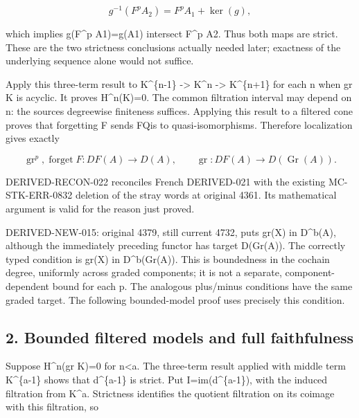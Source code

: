 \[
 g^{-1}(F^p A_2)=F^p A_1+\ker(g),
\]

which implies g(F\^{}p A1)\allowbreak{}\allowbreak{}=g(A1)\allowbreak{} intersect F\^{}p A2. Thus both maps are strict. These are the two strictness conclusions actually needed later; exactness of the underlying sequence alone would not suffice.

Apply this three-term result to K\^{}\{n-1\} \allowbreak{}-> K\^{}n \allowbreak{}-> K\textasciicircum{}\{n\allowbreak{}+1\} for each n when gr K is acyclic. It proves H\textasciicircum{}n(K)\allowbreak{}\allowbreak{}=0. The common filtration interval may depend on n:\allowbreak{} the source\textquotesingle s degreewise finiteness suffices. Applying this result to a filtered cone proves that forgetting F sends FQis to quasi-isomorphisms. Therefore localization gives exactly

\[
 \operatorname{gr}^p,\operatorname{forget}F:DF(A)\longrightarrow D(A),
 \qquad \operatorname{gr}:DF(A)\longrightarrow D(\operatorname{Gr}(A)).
\]

DERIVED-RECON-022 reconciles French DERIVED-021 with the existing MC-STK-ERR-0832 deletion of the stray words at original 4361. Its mathematical argument is valid for the reason just proved.

DERIVED-NEW-015:\allowbreak{} original 4379,\allowbreak{} still current 4732,\allowbreak{} puts gr(X)\allowbreak{} in D\textasciicircum{}b(A)\allowbreak{},\allowbreak{} although the immediately preceding functor has target D(Gr(A)\allowbreak{})\allowbreak{}. The correctly typed condition is gr(X)\allowbreak{} in D\textasciicircum{}b(Gr(A)\allowbreak{})\allowbreak{}. This is boundedness in the cochain degree,\allowbreak{} uniformly across graded components; it is not a separate,\allowbreak{} component-dependent bound for each p. The analogous plus/\allowbreak{}minus conditions have the same graded target. The following bounded-model proof uses precisely this condition.

\subsection{2. Bounded filtered models and full faithfulness}\label{proofs-4166-5089-bounded-filtered-models-and-full-faithfulness}

Suppose H\^{}n(gr K)\allowbreak{}\allowbreak{}=0 for n\textless a. The three-term result applied with middle term K\^{}\{a-1\} shows that d\^{}\{a-1\} is strict. Put I\allowbreak{}=im(d\textasciicircum{}\{a-1\})\allowbreak{},\allowbreak{} with the induced filtration from K\^{}a. Strictness identifies the quotient filtration on its coimage with this filtration,\allowbreak{} so

